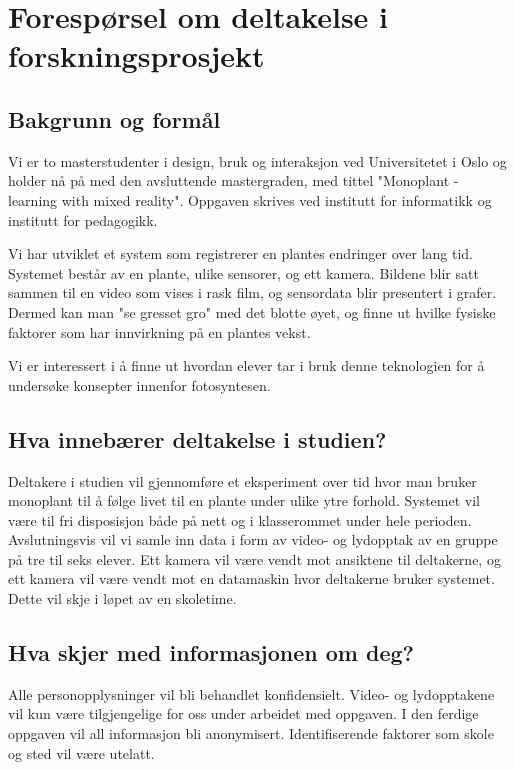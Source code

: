 \documentclass[a4paper,norsk,12pt]{article} %
\begin{document}
\section*{Forespørsel om deltakelse i forskningsprosjekt}

\subsection*{Bakgrunn og formål}
Vi er to masterstudenter i design, bruk og interaksjon ved Universitetet i Oslo og holder nå på med den avsluttende mastergraden, med tittel "Monoplant - learning with mixed reality". Oppgaven skrives ved institutt for informatikk og institutt for pedagogikk. 

Vi har utviklet et system som registrerer en plantes endringer over lang tid. Systemet består av en plante, ulike sensorer, og ett kamera. Bildene blir satt sammen til en video som vises i rask film, og sensordata blir presentert i grafer. Dermed kan man "se gresset gro" med det blotte øyet, og finne ut hvilke fysiske faktorer som har innvirkning på en plantes vekst. 

Vi er interessert i å finne ut hvordan elever tar i bruk denne teknologien for å undersøke konsepter innenfor fotosyntesen. 

\subsection*{Hva innebærer deltakelse i studien?}
Deltakere i studien vil gjennomføre et eksperiment over tid hvor man bruker monoplant til å følge livet til en plante under ulike ytre forhold. Systemet vil være til fri disposisjon både på nett og i klasserommet under hele perioden. Avslutningsvis vil vi samle inn data i form av video- og lydopptak av en gruppe på tre til seks elever. Ett kamera vil være vendt mot ansiktene til deltakerne, og ett kamera vil være vendt mot en datamaskin hvor deltakerne bruker systemet. Dette vil skje i løpet av en skoletime. 

\subsection*{Hva skjer med informasjonen om deg?}
Alle personopplysninger vil bli behandlet konfidensielt. Video- og lydopptakene vil kun være tilgjengelige for oss under arbeidet med oppgaven. I den ferdige oppgaven vil all informasjon bli anonymisert. Identifiserende faktorer som skole og sted vil være utelatt. 
\end{document}
